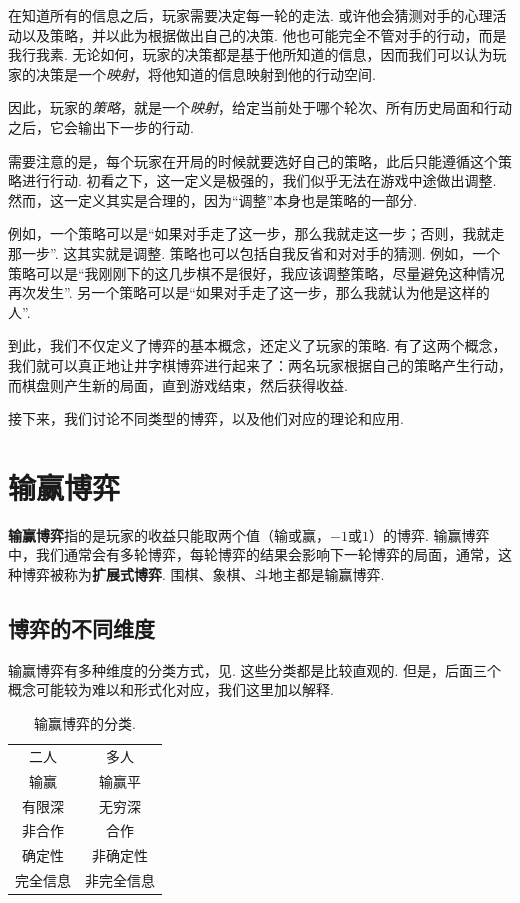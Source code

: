 在知道所有的信息之后，玩家需要决定每一轮的走法. 或许他会猜测对手的心理活动以及策略，并以此为根据做出自己的决策. 他也可能完全不管对手的行动，而是我行我素. 无论如何，玩家的决策都是基于他所知道的信息，因而我们可以认为玩家的决策是一个\textit{映射}，将他知道的信息映射到他的行动空间. 

因此，玩家的\textit{策略}，就是一个\textit{映射}，给定当前处于哪个轮次、所有历史局面和行动之后，它会输出下一步的行动. 

需要注意的是，每个玩家在开局的时候就要选好自己的策略，此后只能遵循这个策略进行行动. 初看之下，这一定义是极强的，我们似乎无法在游戏中途做出调整. 然而，这一定义其实是合理的，因为“调整”本身也是策略的一部分. 

例如，一个策略可以是“如果对手走了这一步，那么我就走这一步；否则，我就走那一步”. 这其实就是调整. 策略也可以包括自我反省和对对手的猜测. 例如，一个策略可以是“我刚刚下的这几步棋不是很好，我应该调整策略，尽量避免这种情况再次发生”. 另一个策略可以是“如果对手走了这一步，那么我就认为他是这样的人”.

到此，我们不仅定义了博弈的基本概念，还定义了玩家的策略. 有了这两个概念，我们就可以真正地让井字棋博弈进行起来了：两名玩家根据自己的策略产生行动，而棋盘则产生新的局面，直到游戏结束，然后获得收益. 

接下来，我们讨论不同类型的博弈，以及他们对应的理论和应用. 

\section{输赢博弈}

\textbf{输赢博弈}指的是玩家的收益只能取两个值（输或赢，$-1$或$1$）的博弈. 输赢博弈中，我们通常会有多轮博弈，每轮博弈的结果会影响下一轮博弈的局面，通常，这种博弈被称为\textbf{扩展式博弈}. 围棋、象棋、斗地主都是输赢博弈. 

\subsection{博弈的不同维度}

输赢博弈有多种维度的分类方式，见. 这些分类都是比较直观的. 但是，后面三个概念可能较为难以和形式化对应，我们这里加以解释. 

\begin{table}[ht]
    \centering
    \begin{tabular}{cc}
        \toprule
        二人 & 多人 \\
        输赢 & 输赢平\\
        有限深 & 无穷深 \\
        非合作 & 合作\\
        确定性 & 非确定性 \\
        完全信息 & 非完全信息 \\
        \bottomrule
    \end{tabular}
    \caption{输赢博弈的分类.}
    \label{tab:win-lose-game}
\end{table}

